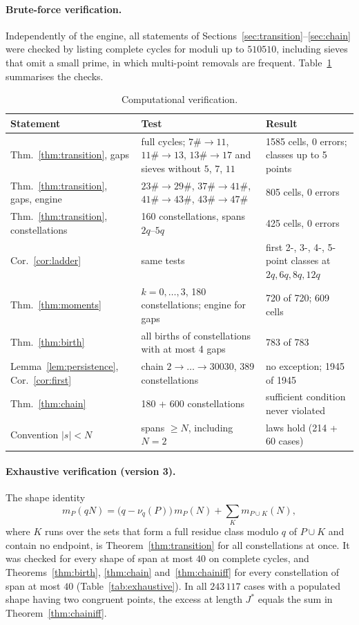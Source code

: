 \documentclass[11pt]{article}
\theoremstyle{definition}
\theoremstyle{remark}
\begin{document}
\paragraph{Brute-force verification.} Independently of the engine, all statements of Sections~\ref{sec:transition}--\ref{sec:chain} were checked by listing complete cycles for moduli up to $510510$, including sieves that omit a small prime, in which multi-point removals are frequent. Table~\ref{tab:verification} summarises the checks.

\begin{table}[ht]
\centering
\small
\begin{tabular}{p{4.3cm}p{5.6cm}p{4.3cm}}
\toprule
Statement & Test & Result \\
\midrule
Thm.~\ref{thm:transition}, gaps & full cycles; $7\#\to11$, $11\#\to13$, $13\#\to17$ and sieves without $5$, $7$, $11$ & 1585 cells, 0 errors; classes up to 5 points \\
Thm.~\ref{thm:transition}, gaps, engine & $23\#\to29\#$, $37\#\to41\#$, $41\#\to43\#$, $43\#\to47\#$ & 805 cells, 0 errors \\
Thm.~\ref{thm:transition}, constellations & 160 constellations, spans $2q$--$5q$ & 425 cells, 0 errors \\
Cor.~\ref{cor:ladder} & same tests & first 2-, 3-, 4-, 5-point classes at $2q, 6q, 8q, 12q$ \\
Thm.~\ref{thm:moments} & $k = 0,\dots,3$, 180 constellations; engine for gaps & 720 of 720; 609 cells \\
Thm.~\ref{thm:birth} & all births of constellations with at most 4 gaps & 783 of 783 \\
Lemma~\ref{lem:persistence}, Cor.~\ref{cor:first} & chain $2 \to \dots \to 30030$, 389 constellations & no exception; 1945 of 1945 \\
Thm.~\ref{thm:chain} & 180 + 600 constellations & sufficient condition never violated \\
Convention $|s| < N$ & spans $\ge N$, including $N = 2$ & laws hold (214 + 60 cases) \\
\bottomrule
\end{tabular}
\caption{Computational verification.}\label{tab:verification}
\end{table}

\paragraph{Exhaustive verification (version 3).} The shape identity
\[
  m_P(qN) = \big(q - \nu_q(P)\big)\, m_P(N) + \sum_K m_{P \cup K}(N),
\]
where $K$ runs over the sets that form a full residue class modulo $q$ of $P \cup K$ and contain no endpoint, is Theorem~\ref{thm:transition} for all constellations at once. It was checked for every shape of span at most $40$ on complete cycles, and Theorems~\ref{thm:birth}, \ref{thm:chain} and~\ref{thm:chainiff} for every constellation of span at most $40$ (Table~\ref{tab:exhaustive}). In all $243\,117$ cases with a populated shape having two congruent points, the excess at length $J^*$ equals the sum in Theorem~\ref{thm:chainiff}.
\end{document}
